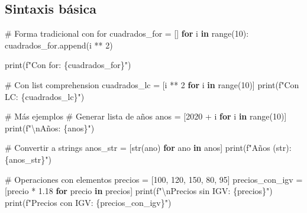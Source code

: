 \documentclass[
  doc,
  floatsintext,
  longtable,
  a4paper,
  nolmodern,
  notxfonts,
  notimes,
  12pt,
  colorlinks=true,linkcolor=blue,citecolor=blue,urlcolor=blue]{apa7}
\newenvironment{Shaded}{\begin{snugshade}}{\end{snugshade}}
\newcommand{\BuiltInTok}[1]{\textcolor[rgb]{0.00,0.23,0.31}{#1}}
\newcommand{\CharTok}[1]{\textcolor[rgb]{0.13,0.47,0.30}{#1}}
\newcommand{\CommentTok}[1]{\textcolor[rgb]{0.37,0.37,0.37}{#1}}
\newcommand{\ControlFlowTok}[1]{\textcolor[rgb]{0.00,0.23,0.31}{\textbf{#1}}}
\newcommand{\DecValTok}[1]{\textcolor[rgb]{0.68,0.00,0.00}{#1}}
\newcommand{\FloatTok}[1]{\textcolor[rgb]{0.68,0.00,0.00}{#1}}
\newcommand{\KeywordTok}[1]{\textcolor[rgb]{0.00,0.23,0.31}{\textbf{#1}}}
\newcommand{\NormalTok}[1]{\textcolor[rgb]{0.00,0.23,0.31}{#1}}
\newcommand{\OperatorTok}[1]{\textcolor[rgb]{0.37,0.37,0.37}{#1}}
\newcommand{\SpecialCharTok}[1]{\textcolor[rgb]{0.37,0.37,0.37}{#1}}
\newcommand{\SpecialStringTok}[1]{\textcolor[rgb]{0.13,0.47,0.30}{#1}}
\begin{document}
\subsection{Sintaxis básica}\label{sintaxis-buxe1sica}

\begin{Shaded}
\begin{Highlighting}[]
\CommentTok{\# Forma tradicional con for}
\NormalTok{cuadrados\_for }\OperatorTok{=}\NormalTok{ []}
\ControlFlowTok{for}\NormalTok{ i }\KeywordTok{in} \BuiltInTok{range}\NormalTok{(}\DecValTok{10}\NormalTok{):}
\NormalTok{    cuadrados\_for.append(i }\OperatorTok{**} \DecValTok{2}\NormalTok{)}

\BuiltInTok{print}\NormalTok{(}\SpecialStringTok{f"Con for: }\SpecialCharTok{\{}\NormalTok{cuadrados\_for}\SpecialCharTok{\}}\SpecialStringTok{"}\NormalTok{)}

\CommentTok{\# Con list comprehension}
\NormalTok{cuadrados\_lc }\OperatorTok{=}\NormalTok{ [i }\OperatorTok{**} \DecValTok{2} \ControlFlowTok{for}\NormalTok{ i }\KeywordTok{in} \BuiltInTok{range}\NormalTok{(}\DecValTok{10}\NormalTok{)]}
\BuiltInTok{print}\NormalTok{(}\SpecialStringTok{f"Con LC:  }\SpecialCharTok{\{}\NormalTok{cuadrados\_lc}\SpecialCharTok{\}}\SpecialStringTok{"}\NormalTok{)}

\CommentTok{\# Más ejemplos}
\CommentTok{\# Generar lista de años}
\NormalTok{anos }\OperatorTok{=}\NormalTok{ [}\DecValTok{2020} \OperatorTok{+}\NormalTok{ i }\ControlFlowTok{for}\NormalTok{ i }\KeywordTok{in} \BuiltInTok{range}\NormalTok{(}\DecValTok{10}\NormalTok{)]}
\BuiltInTok{print}\NormalTok{(}\SpecialStringTok{f"}\CharTok{\textbackslash{}n}\SpecialStringTok{Años: }\SpecialCharTok{\{}\NormalTok{anos}\SpecialCharTok{\}}\SpecialStringTok{"}\NormalTok{)}

\CommentTok{\# Convertir a strings}
\NormalTok{anos\_str }\OperatorTok{=}\NormalTok{ [}\BuiltInTok{str}\NormalTok{(ano) }\ControlFlowTok{for}\NormalTok{ ano }\KeywordTok{in}\NormalTok{ anos]}
\BuiltInTok{print}\NormalTok{(}\SpecialStringTok{f"Años (str): }\SpecialCharTok{\{}\NormalTok{anos\_str}\SpecialCharTok{\}}\SpecialStringTok{"}\NormalTok{)}

\CommentTok{\# Operaciones con elementos}
\NormalTok{precios }\OperatorTok{=}\NormalTok{ [}\DecValTok{100}\NormalTok{, }\DecValTok{120}\NormalTok{, }\DecValTok{150}\NormalTok{, }\DecValTok{80}\NormalTok{, }\DecValTok{95}\NormalTok{]}
\NormalTok{precios\_con\_igv }\OperatorTok{=}\NormalTok{ [precio }\OperatorTok{*} \FloatTok{1.18} \ControlFlowTok{for}\NormalTok{ precio }\KeywordTok{in}\NormalTok{ precios]}
\BuiltInTok{print}\NormalTok{(}\SpecialStringTok{f"}\CharTok{\textbackslash{}n}\SpecialStringTok{Precios sin IGV: }\SpecialCharTok{\{}\NormalTok{precios}\SpecialCharTok{\}}\SpecialStringTok{"}\NormalTok{)}
\BuiltInTok{print}\NormalTok{(}\SpecialStringTok{f"Precios con IGV: }\SpecialCharTok{\{}\NormalTok{precios\_con\_igv}\SpecialCharTok{\}}\SpecialStringTok{"}\NormalTok{)}
\end{Highlighting}
\end{Shaded}
\end{document}
